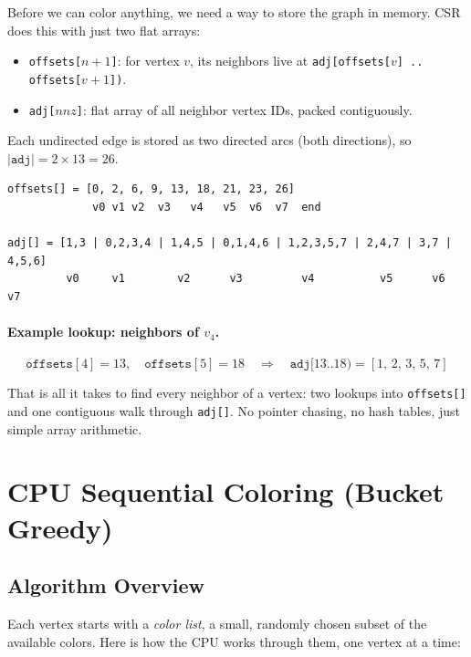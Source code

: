 \documentclass[11pt,letterpaper]{article}
\begin{document}
Before we can color anything, we need a way to store the graph in memory. CSR does this with just two flat arrays:
\begin{itemize}[nosep]
  \item \texttt{offsets[$n{+}1$]}: for vertex $v$, its neighbors live at \texttt{adj[offsets[$v$]\,..\,offsets[$v{+}1$])}.
  \item \texttt{adj[$\mathit{nnz}$]}: flat array of all neighbor vertex IDs, packed contiguously.
\end{itemize}

Each undirected edge is stored as two directed arcs (both directions), so $|\texttt{adj}| = 2 \times 13 = 26$.

\begin{lstlisting}
offsets[] = [0, 2, 6, 9, 13, 18, 21, 23, 26]
             v0 v1 v2  v3   v4   v5  v6  v7  end

adj[] = [1,3 | 0,2,3,4 | 1,4,5 | 0,1,4,6 | 1,2,3,5,7 | 2,4,7 | 3,7 | 4,5,6]
         v0     v1        v2      v3         v4          v5      v6    v7
\end{lstlisting}

\paragraph{Example lookup: neighbors of $v_4$.}
\[
  \texttt{offsets}[4] = 13, \quad \texttt{offsets}[5] = 18 \quad\Longrightarrow\quad \texttt{adj}[13..18) = [1,\,2,\,3,\,5,\,7]
\]

That is all it takes to find every neighbor of a vertex: two lookups into \texttt{offsets[]} and one contiguous walk through \texttt{adj[]}. No pointer chasing, no hash tables, just simple array arithmetic.

\section{CPU Sequential Coloring (Bucket Greedy)}
\label{sec:cpu}

\subsection{Algorithm Overview}

Each vertex starts with a \emph{color list}, a small, randomly chosen subset of the available colors. Here is how the CPU works through them, one vertex at a time:
\end{document}
